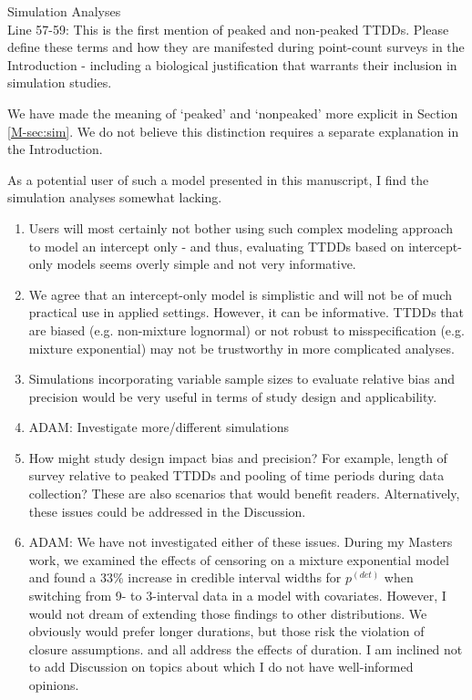 \documentclass[12pt]{article}
\renewenvironment{quote}  %
              {\list{}{\rightmargin\leftmargin}\normalfont%
               \item\relax}
              {\endlist}
\newcommand{\adam}[1]{{\color{blue} ADAM: #1}}
\newcommand{\pdet}{p^{(det)}}
\begin{document}
Simulation Analyses\\
Line 57-59: This is the first mention of peaked and non-peaked TTDDs.  Please define these terms and how they are manifested during point-count surveys in the Introduction - including a biological justification that warrants their inclusion in simulation studies.
\begin{quote}
We have made the meaning of `peaked' and `nonpeaked' more explicit in Section \ref{M-sec:sim}.
We do not believe this distinction requires a separate explanation in the Introduction.
\end{quote}

As a potential user of such a model presented in this manuscript, I find the simulation analyses somewhat lacking.   
\begin{enumerate}
\item Users will most certainly not bother using such complex modeling approach to model an intercept only - and thus, evaluating TTDDs based on intercept-only models seems overly simple and not very informative.
\begin{quote}
We agree that an intercept-only model is simplistic and will not be of much practical use in applied settings.
However, it can be informative.
TTDDs that are biased (e.g. non-mixture lognormal) or not robust to misspecification (e.g. mixture exponential) may not be trustworthy in more complicated analyses.
\end{quote}
\item Simulations incorporating variable sample sizes to evaluate relative bias and precision would be very useful in terms of study design and applicability.  
\begin{quote}
\adam{Investigate more/different simulations}
\end{quote}
\item How might study design impact bias and precision?  For example, length of survey relative to peaked TTDDs and pooling of time periods during data collection?  These are also scenarios that would benefit readers.  Alternatively, these issues could be addressed in the Discussion.
\begin{quote}
\adam{We have not investigated either of these issues.
During my Masters work, we examined the effects of censoring on a mixture exponential model and found a 33\% increase in credible interval widths for $\pdet$ when switching from 9- to 3-interval data in a model with covariates.
However, I would not dream of extending those findings to other distributions.
We obviously would prefer longer durations, but those risk the violation of closure assumptions.
\citet{Petit1995, Johnson2008, LeeMarsden2008} and \citet{Reidy2011} all address the effects of duration.
I am inclined not to add Discussion on topics about which I do not have well-informed opinions.

}
\end{quote}
\end{enumerate}
\end{document}

